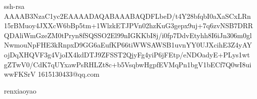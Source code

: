 ssh-rsa AAAAB3NzaC1yc2EAAAADAQABAAABAQDFLbeD/t4Y28bfqbI0aXaSCxLRn15rBMuoy4JXXcW6bBp5tm+1WlzkETJPVn02hzKuG3gepx9uj+7q6zvNSB7DRRQDAliWmGzeZM0tPryn8fSQSSO2El99nIGKKbI8j/i0fp7DdvEtyhh8I6iJn306m0glNwmouNpFHE3kRnpxD9GG6aEufKP66tiWWSAWSB1uvnYY0UJXcihE3Z4yAYojDqXHQVF3g4VjoIX4kdDTJ9ZFSST2QjyFg4yiP6jFEtp/eNDOadyE+PLys1wtgZTwV0/CdK7qUYxawPsRHLZt8c+b5VsqbwHgpfEVMqPn1bgV1bECf7Q0wI8uiwwFKSrV 1615130433@qq.com


renxiaoyao
